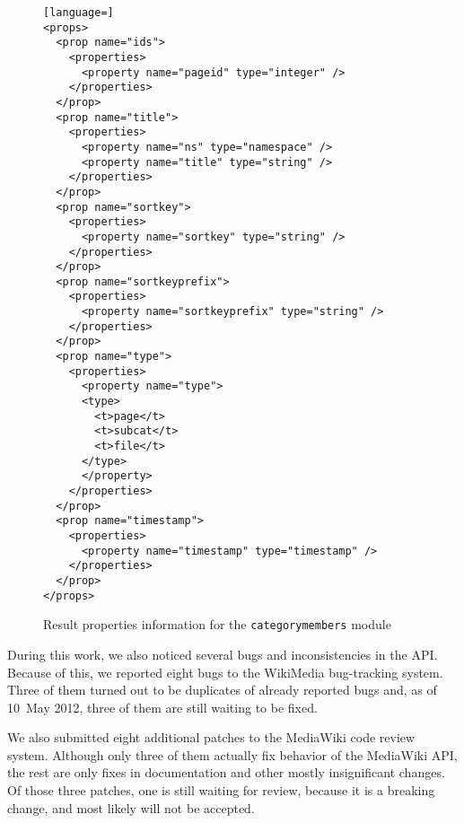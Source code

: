\begin{figure}[p]

\begin{lstlisting}[language=]
<props>
  <prop name="ids">
    <properties>
      <property name="pageid" type="integer" />
    </properties>
  </prop>
  <prop name="title">
    <properties>
      <property name="ns" type="namespace" />
      <property name="title" type="string" />
    </properties>
  </prop>
  <prop name="sortkey">
    <properties>
      <property name="sortkey" type="string" />
    </properties>
  </prop>
  <prop name="sortkeyprefix">
    <properties>
      <property name="sortkeyprefix" type="string" />
    </properties>
  </prop>
  <prop name="type">
    <properties>
      <property name="type">
      <type>
        <t>page</t>
        <t>subcat</t>
        <t>file</t>
      </type>
      </property>
    </properties>
  </prop>
  <prop name="timestamp">
    <properties>
      <property name="timestamp" type="timestamp" />
    </properties>
  </prop>
</props>
\end{lstlisting}

\caption{Result properties information for the \texttt{categorymembers} module}
\label{paraminfo props}
\end{figure}

During this work, we also noticed several bugs and inconsistencies in the \ac{API}.
Because of this, we reported eight bugs to the WikiMedia bug-tracking system.
Three of them turned out to be duplicates of already reported bugs and,
as of 10~May 2012, three of them are still waiting to be fixed.

We also submitted eight additional patches to the MediaWiki code review system.
Although only three of them actually fix behavior of the MediaWiki \ac{API},
the rest are only fixes in documentation and other mostly insignificant changes.
Of those three patches, one is still waiting for review, because it is a breaking change,
and most likely will not be accepted.